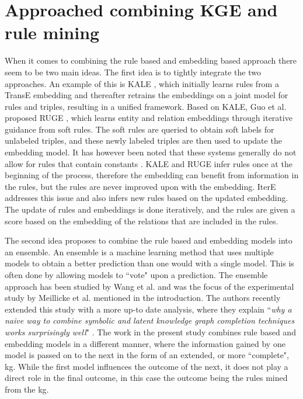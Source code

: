 \section{Approached combining KGE and rule mining}
When it comes to combining the rule based and embedding based approach there seem to be two main ideas. The first idea is to tightly integrate the two approaches. An example of this is KALE \cite{KALE}, which initially learns rules from a TransE embedding and thereafter retrains the embeddings on a joint model for rules and triples, resulting in a unified framework. Based on KALE, Guo et al. proposed RUGE \cite{RUGE}, which learns entity and relation embeddings through iterative guidance from soft rules. The soft rules are queried to obtain soft labels for unlabeled triples, and these newly labeled triples are then used to update the embedding model. It has however been noted that these systems generally do not allow for rules that contain constants \cite{meilicke2021naive}. KALE and RUGE infer rules once at the beginning of the process, therefore the embedding can benefit from information in the rules, but the rules are never improved upon with the embedding. IterE \cite{zhang2019iteratively} addresses this issue and also infers new rules based on the updated embedding. The update of rules and embeddings is done iteratively, and the rules are given a score based on the embedding of the relations that are included in the rules.

The second idea proposes to combine the rule based and embedding models into an ensemble. An ensemble is a machine learning method that uses multiple models to obtain a better prediction than one would with a single model. This is often done by allowing models to ``vote" upon a prediction. The ensemble approach has been studied by Wang et al. \cite{wang2018multi} and was the focus of the experimental study by Meillicke et al. \cite{ensemble} mentioned in the introduction. The authors recently extended this study with a more up-to date analysis, where they explain ``\textit{why a naive way to combine symbolic and latent knowledge graph completion techniques works surprisingly well}" \cite{meilicke2021naive}. The work in the present study combines rule based and embedding models in a different manner, where the information gained by one model is passed on to the next in the form of an extended, or more ``complete", \gls{kg}. While the first model influences the outcome of the next, it does not play a direct role in the final outcome, in this case the outcome being the rules mined from the \gls{kg}.

